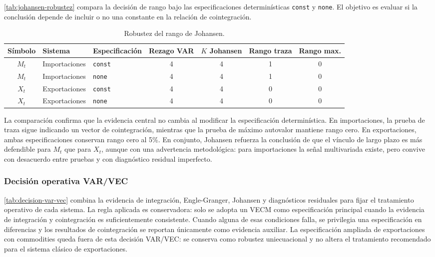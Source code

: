\documentclass[11pt,a4paper]{article}
\begin{document}
	\autoref{tab:johansen-robustez} compara la decisión de rango bajo las
	especificaciones determinísticas \texttt{const} y \texttt{none}. El objetivo
	es evaluar si la conclusión depende de incluir o no una constante en la
	relación de cointegración.
	
	\begin{table}[H]
		\centering
		\caption{Robustez del rango de Johansen.}
		\label{tab:johansen-robustez}
		\small
		\begin{tabular}{cllcccc}
			\toprule
			Símbolo & Sistema & Especificación & Rezago VAR & \(K\) Johansen & Rango traza & Rango max. \\
			\midrule
			\(M_t\) & Importaciones & \texttt{const} & 4 & 4 & 1 & 0 \\
			\(M_t\) & Importaciones & \texttt{none} & 4 & 4 & 1 & 0 \\
			\(X_t\) & Exportaciones & \texttt{const} & 4 & 4 & 0 & 0 \\
			\(X_t\) & Exportaciones & \texttt{none} & 4 & 4 & 0 & 0 \\
			\bottomrule
		\end{tabular}
	\end{table}
	
	La comparación confirma que la evidencia central no cambia al modificar la
	especificación determinística. En importaciones, la prueba de traza sigue
	indicando un vector de cointegración, mientras que la prueba de máximo autovalor
	mantiene rango cero. En exportaciones, ambas especificaciones conservan rango
	cero al 5\%. En conjunto, Johansen refuerza la conclusión de que el vínculo de
	largo plazo es más defendible para \(M_t\) que para \(X_t\), aunque con una
	advertencia metodológica: para importaciones la señal multivariada existe, pero
	convive con desacuerdo entre pruebas y con diagnóstico residual imperfecto.
	
	\subsubsection{Decisión operativa VAR/VEC}
	\label{subsubsec:decision-var-vec}
	
	\autoref{tab:decision-var-vec} combina la evidencia de integración,
	Engle-Granger, Johansen y diagnósticos residuales para fijar el tratamiento
	operativo de cada sistema. La regla aplicada es conservadora: solo se adopta un
	VECM como especificación principal cuando la evidencia de integración y
	cointegración es suficientemente consistente. Cuando alguna de esas condiciones
	falla, se privilegia una especificación en diferencias y los resultados de
	cointegración se reportan únicamente como evidencia auxiliar. La especificación
	ampliada de exportaciones con commodities queda fuera de esta decisión VAR/VEC:
	se conserva como robustez uniecuacional y no altera el tratamiento recomendado
	para el sistema clásico de exportaciones.
	
\end{document}
